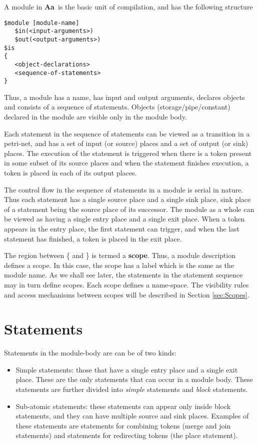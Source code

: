 \documentclass{article}
\newcommand{\Aa}{{\bf Aa}~}
\begin{document}
A module in \Aa is the basic unit of compilation, and
has the following structure
\begin{verbatim}
$module [module-name] 
   $in(<input-arguments>)
   $out(<output-arguments>)
$is
{
   <object-declarations>
   <sequence-of-statements>
}
\end{verbatim}
Thus, a module has a name, has input and output arguments,
declares objects and consists of a sequence of statements.
Objects (storage/pipe/constant) declared in the module are visible only in the
module body. 

Each statement in the sequence
of statements can be viewed as a transition
in a petri-net, and has a 
set of input (or source) places  and a set of output
(or sink)  places.  
The execution of the statement is triggered when
there is a token present in some subset of its source 
places and when the statement finishes execution,
a token is placed in each of its output places.

The control flow in the sequence of statements
in a module is serial in nature.  Thus each
statement has a single source place and a single
sink place, sink place of a statement being 
the source place of its successor.
The module as a whole can be viewed as having
a single entry place and a single exit place.
When a token appears in the entry place, the first
statement can trigger, and when the last statement
has finished, a token is placed in the exit
place.  

The region between \{ and \} is termed a {\bf scope}.  Thus, 
a module description defines a scope.  In this case, 
the scope has a label which is the same as the module name.
As we shall see later, the statements in the statement sequence
may in turn define scopes.  Each scope defines a name-space.  
The visibility
rules and access mechanisms between scopes will be described
in Section \ref{sec:Scopes}.


\section{Statements}
 
Statements in the module-body are can be of two kinds:
\begin{itemize}
\item Simple statements: those that have a single
entry place and a single exit place.  These are
the only statements that can occur in a module body.
These statements are further divided into 
{\em simple} statements and {\em block} statements.
\item Sub-atomic statements:  these statements
can appear only inside block statements,  and they
can have multiple source and sink places.
Examples of these statements are statements for
combining tokens (merge and join statements) and
statements for redirecting tokens (the place statement).
\end{itemize}
\end{document}
